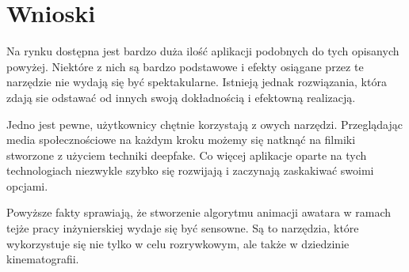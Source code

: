
\section{Wnioski}
Na rynku dostępna jest bardzo duża ilość aplikacji podobnych do tych opisanych powyżej. Niektóre z nich są bardzo podstawowe i efekty osiągane przez te narzędzie nie wydają się być spektakularne. Istnieją jednak rozwiązania, która zdają sie odstawać od innych swoją dokładnością i efektowną realizacją. 

Jedno jest pewne, użytkownicy chętnie korzystają z owych narzędzi. Przeglądając media społecznościowe na każdym kroku możemy się natknąć na filmiki stworzone z użyciem techniki deepfake. Co więcej aplikacje oparte na tych technologiach niezwykle szybko się rozwijają i zaczynają zaskakiwać swoimi opcjami.

Powyższe fakty sprawiają, że stworzenie algorytmu animacji awatara w ramach tejże pracy inżynierskiej wydaje się być sensowne. Są to narzędzia, które wykorzystuje się nie tylko w celu rozrywkowym, ale także w dziedzinie kinematografii. 


